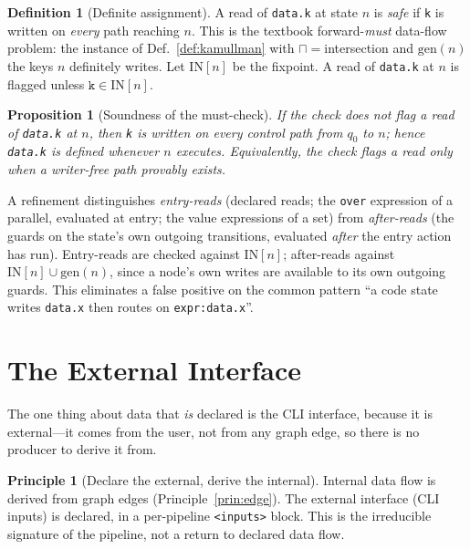 \documentclass[11pt]{article}
\theoremstyle{plain}
\newtheorem{proposition}[theorem]{Proposition}
\theoremstyle{definition}
\newtheorem{definition}[theorem]{Definition}
\newtheorem{principle}[theorem]{Principle}
\theoremstyle{remark}
\newcommand{\code}[1]{\texttt{#1}}
\newcommand{\state}[1]{\textsf{#1}}
\newcommand{\meet}{\sqcap}
\begin{document}
\begin{definition}[Definite assignment]
A read of \code{data.k} at state $n$ is \emph{safe} if \code{k} is written on
\emph{every} path reaching $n$. This is the textbook forward-\emph{must} data-flow
problem: the instance of Def.~\ref{def:kamullman} with $\meet = {}$intersection and
$\mathrm{gen}(n)$ the keys $n$ definitely writes. Let $\mathrm{IN}[n]$ be the
fixpoint. A read of \code{data.k} at $n$ is flagged unless $\code{k} \in
\mathrm{IN}[n]$.
\end{definition}

\begin{proposition}[Soundness of the must-check]
If the check does not flag a read of \code{data.k} at $n$, then \code{k} is written
on every control path from $q_0$ to $n$; hence \code{data.k} is defined whenever $n$
executes. Equivalently, the check flags a read only when a writer-free path provably
exists.
\end{proposition}

A refinement distinguishes \emph{entry-reads} (declared reads; the \code{over}
expression of a \state{parallel}, evaluated at entry; the value expressions of a
\state{set}) from \emph{after-reads} (the guards on the state's own outgoing
transitions, evaluated \emph{after} the entry action has run). Entry-reads are
checked against $\mathrm{IN}[n]$; after-reads against $\mathrm{IN}[n] \cup
\mathrm{gen}(n)$, since a node's own writes are available to its own outgoing guards.
This eliminates a false positive on the common pattern ``a \state{code} state writes
\code{data.x} then routes on \code{expr:data.x}''.

\section{The External Interface}\label{sec:inputs}

The one thing about data that \emph{is} declared is the CLI interface, because it
is external---it comes from the user, not from any graph edge, so there is no
producer to derive it from.

\begin{principle}[Declare the external, derive the internal]\label{prin:law}
Internal data flow is derived from graph edges (Principle~\ref{prin:edge}). The
external interface (CLI inputs) is declared, in a per-pipeline \code{<inputs>}
block. This is the irreducible signature of the pipeline, not a return to declared
data flow.
\end{principle}
\end{document}

